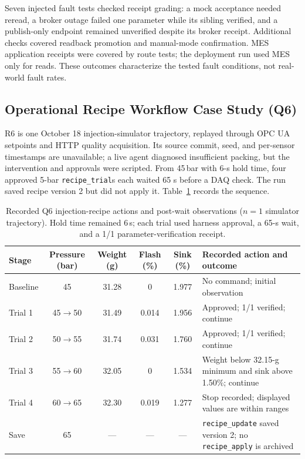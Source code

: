 Seven injected fault tests checked receipt grading: a mock acceptance needed
reread, a broker outage failed one parameter while its sibling verified, and
a publish-only endpoint remained unverified despite its broker receipt.
Additional checks covered readback promotion and manual-mode confirmation.
MES application receipts were covered by route tests; the deployment run used
MES only for reads. These outcomes characterize the tested fault conditions,
not real-world fault rates.

\subsection{Operational Recipe Workflow Case Study (Q6)}
\label{sec:recipeexperiment}
R6 is one October 18 injection-simulator trajectory, replayed through OPC UA
setpoints and HTTP quality acquisition. Its source commit, seed, and
per-sensor timestamps are unavailable; a live agent diagnosed insufficient
packing, but the intervention and approvals were scripted. From 45\,bar with
6-s hold time, four approved 5-bar \texttt{recipe\_trial}s each waited 65 s
before a DAQ check. The run saved recipe version 2 but did not apply it.
Table~\ref{tab:q6actions} records the sequence.

\begin{table}[!t]
\centering
\caption{Recorded Q6 injection-recipe actions and post-wait observations
($n=1$ simulator trajectory). Hold time remained 6\,s; each trial used
harness approval, a 65-s wait, and a 1/1 parameter-verification receipt.}
\label{tab:q6actions}
\footnotesize
\setlength{\tabcolsep}{3.5pt}
\begin{tabularx}{\textwidth}{@{}l c c c c X@{}}
\toprule
Stage & Pressure (bar) & Weight (g) & Flash (\%) & Sink (\%) & Recorded action and outcome \\
\midrule
Baseline & 45 & 31.28 & 0 & 1.977 & No command; initial observation \\
Trial 1 & 45$\rightarrow$50 & 31.49 & 0.014 & 1.956 & Approved; 1/1 verified; continue \\
Trial 2 & 50$\rightarrow$55 & 31.74 & 0.031 & 1.760 & Approved; 1/1 verified; continue \\
Trial 3 & 55$\rightarrow$60 & 32.05 & 0 & 1.534 & Weight below 32.15-g minimum and sink above 1.50\%; continue \\
Trial 4 & 60$\rightarrow$65 & 32.30 & 0.019 & 1.277 & Stop recorded; displayed values are within ranges \\
Save & 65 & --- & --- & --- & \texttt{recipe\_update} saved version 2; no \texttt{recipe\_apply} is archived \\
\bottomrule
\end{tabularx}
\end{table}

